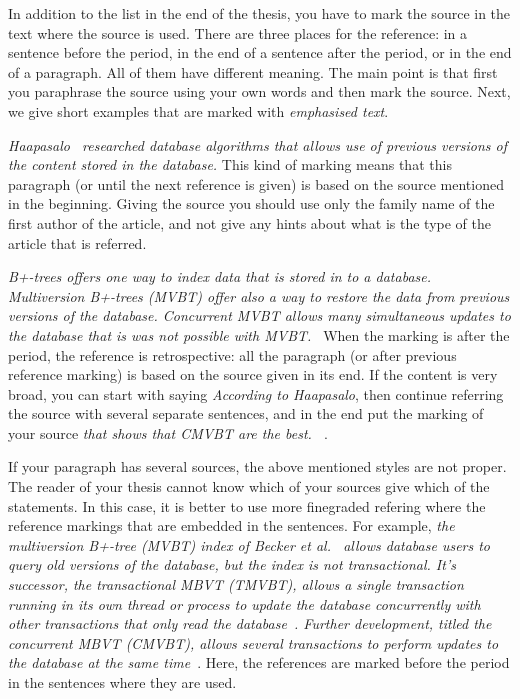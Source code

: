 \documentclass[12pt,a4paper,oneside,pdftex]{report}
\begin{document}
In addition to the list in the end of the thesis, you have to mark the
source in the text where the source is used. There are three places
for the reference: in a sentence before the period, in the end of a
sentence after the period, or in the end of a paragraph. All of them
have different meaning. The main point is that first you paraphrase
the source using your own words and then mark the source. Next, we
give short examples that are marked with \emph{emphasised text}.

\emph{Haapasalo~\cite{HaapasaloThesis} researched database algorithms
  that allows use of previous versions of the content stored in the
  database.} This kind of marking means that this paragraph (or until
the next reference is given) is based on the source mentioned in the
beginning.  Giving the source you should use only the family name of
the first author of the article, and not give any hints about what is
the type of the article that is referred.

\emph{B+-trees offers one way to index data that is stored in to a
  database. Multiversion B+-trees (MVBT) offer also a way to restore
  the data from previous versions of the database. Concurrent MVBT
  allows many simultaneous updates to the database that is was not
  possible with MVBT.~\cite{HaapasaloThesis}} When the marking is
after the period, the reference is retrospective: all the paragraph
(or after previous reference marking) is based on the source given in
its end. If the content is very broad, you can start with saying
\emph{According to Haapasalo}, then continue referring the source with
several separate sentences, and in the end put the marking of your
source \emph{ that shows that CMVBT are the
  best. ~\cite{HaapasaloThesis}}.

If your paragraph has several sources, the above mentioned styles are
not proper. The reader of your thesis cannot know which of your
sources give which of the statements. In this case, it is better to
use more finegraded refering where the reference markings that are
embedded in the sentences. For example, \emph{the multiversion B+-tree
  (MVBT) index of Becker et al.~\cite{becker:1996:mvbt} allows database
  users to query old versions of the database, but the index is not
  transactional.
  It's successor, the transactional MBVT (TMVBT), allows a single transaction
  running in its own thread or process to update the database concurrently
  with other transactions that only read the
  database~\cite{haapasalo:2009:tmvbt}.
  Further development, titled the concurrent MBVT (CMVBT),
  allows several transactions to perform updates to the database at the same
  time~\cite{HaapasaloThesis}}.
  Here, the references are marked before
  the period in the sentences where they are used.
\end{document}
